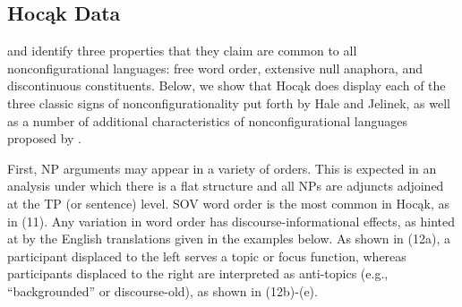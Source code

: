 \documentclass[output=paper]{LSP/langsci}
\begin{document}
\subsection{Hocąk Data}

\citet{Hale1983} and \citet{Jelinek1984} identify three properties that they claim are common to all nonconfigurational languages: free word order, extensive null anaphora, and discontinuous constituents. Below, we show that Hocąk does display each of the three classic signs of nonconfigurationality put forth by Hale and Jelinek, as well as a number of additional characteristics of nonconfigurational languages proposed by \citet{Baker1996}.  

First, NP arguments may appear in a variety of orders.  This is expected in an analysis under which there is a flat structure and all NPs are adjuncts adjoined at the TP (or sentence) level. SOV word order is the most common in Hocąk, as in (11). Any variation in word order has discourse-informational effects, as hinted at by the English translations given in the examples below. As shown in (12a), a participant displaced to the left serves a topic or focus function, whereas participants displaced to the right are interpreted as anti-topics (e.g., ``backgrounded'' or discourse-old), as shown in (12b)-(e).
\end{document}

